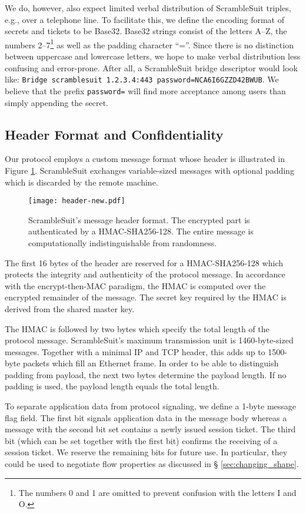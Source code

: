 \documentclass{sig-alternate}
\newcommand{\pt}{\textsf{ScrambleSuit}}
\numberwithin{enumi}{section}
\numberwithin{notesctr}{section}
\begin{document}
We do, however, also expect limited verbal distribution of \pt{} triples, e.g., over a telephone
line. To facilitate this, we define the encoding format of secrets and tickets to be Base32. Base32
strings consist of the letters A--Z, the numbers 2--7\footnote{The numbers 0 and 1 are omitted to
prevent confusion with the letters I and O.} as well as the padding character ``=''. Since
there is no distinction between uppercase and lowercase letters, we hope to make verbal distribution
less confusing and error-prone. After all, a \pt{} bridge descriptor would look like: \texttt{Bridge
scramblesuit 1.2.3.4:443 password=NCA6I6GZZD42BWUB}. We believe that the prefix \texttt{password=}
will find more acceptance among users than simply appending the secret.


\subsection{Header Format and Confidentiality}
\label{sec:confidentiality}
Our protocol employs a custom message format whose header is illustrated in Figure \ref{fig:header}.
\pt{} exchanges variable-sized messages with optional padding which is discarded by the
remote machine.

\begin{figure}
\centering
\texttt{[image: header-new.pdf]}
\caption{\pt{}'s message header format. The encrypted part is authenticated by a HMAC-SHA256-128.
The entire message is computationally indistinguishable from randomness.}
\label{fig:header}
\end{figure}

The first 16 bytes of the header are reserved for a HMAC-SHA256-128 which protects the integrity and
authenticity of the protocol message. In accordance with the encrypt-then-MAC paradigm, the HMAC is
computed over the encrypted remainder of the message. The secret key required by the HMAC is derived
from the shared master key.

The HMAC is followed by two bytes which specify the total length of the protocol message. \pt{}'s
maximum transmission unit is 1460-byte-sized messages. Together with a minimal IP and TCP header,
this adds up to 1500-byte packets which fill an Ethernet frame. In order to be able to distinguish
padding from payload, the next two bytes determine the payload length. If no padding is used, the
payload length equals the total length.

To separate application data from protocol signaling, we define a 1-byte message flag field. The
first bit signals application data in the message body whereas a message with the second bit set
contains a newly issued session ticket. The third bit (which can be set together with the first bit)
confirms the receiving of a session ticket. We reserve the remaining bits for future use. In
particular, they could be used to negotiate flow properties as discussed in \S
\ref{sec:changing_shape}.
\end{document}
